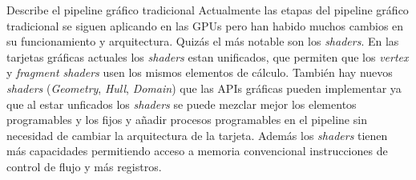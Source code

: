 \begin{pregunta}{Describe el pipeline gráfico tradicional}
Actualmente las etapas del pipeline gráfico tradicional se siguen aplicando en
las GPUs pero han habido muchos cambios en su funcionamiento y arquitectura.
Quizás el más notable son los \emph{shaders}. En las tarjetas gráficas actuales
los \emph{shaders} estan unificados, que permiten que los \emph{vertex} y
\emph{fragment shaders} usen los mismos elementos de cálculo. También
hay nuevos \emph{shaders} (\emph{Geometry}, \emph{Hull}, \emph{Domain})
que las APIs gráficas pueden implementar ya que al estar unficados los \emph{shaders}
se puede mezclar mejor los elementos programables y los fijos y añadir procesos
programables en el pipeline sin necesidad de cambiar la arquitectura de la tarjeta.
Además los \emph{shaders} tienen más capacidades permitiendo acceso a memoria
convencional instrucciones de control de flujo y más registros.

\nocite{
rmit_-_cs_lecture_2017,
giesen_trip_2011,
lawrence_3d_2012,
moller_real-time_2018,
}

\end{pregunta}

